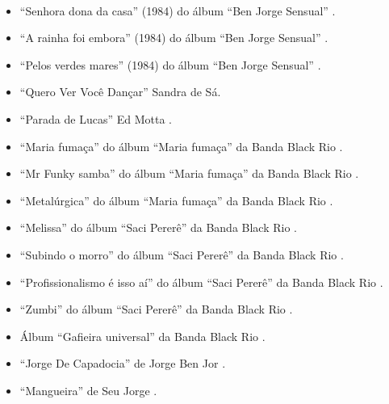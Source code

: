 \begin{example} ~

\begin{itemize}
\item ``Senhora dona da casa'' (1984) do álbum ``Ben Jorge Sensual'' \cite[pp. 195]{sanches2000tropicalismo}.
\item ``A rainha foi embora'' (1984) do álbum ``Ben Jorge Sensual'' \cite[pp. 195]{sanches2000tropicalismo}.
\item ``Pelos verdes mares'' (1984) do álbum ``Ben Jorge Sensual'' \cite[pp. 195]{sanches2000tropicalismo}.
\item ``Quero Ver Você Dançar'' Sandra de Sá.
\item ``Parada de Lucas'' Ed Motta \cite[pp. 11]{medeiros2012brazilian}.
\item ``Maria fumaça'' do álbum ``Maria fumaça'' da Banda Black Rio  \cite[pp. 11]{medeiros2012brazilian}.
\item ``Mr Funky samba'' do álbum ``Maria fumaça'' da Banda Black Rio  \cite[pp. 11]{medeiros2012brazilian}.
\item ``Metalúrgica'' do álbum ``Maria fumaça'' da Banda Black Rio  \cite[pp. 11]{medeiros2012brazilian}.
\item ``Melissa'' do álbum ``Saci Pererê'' da Banda Black Rio  \cite[pp. 11]{medeiros2012brazilian}.
\item ``Subindo o morro'' do álbum ``Saci Pererê'' da Banda Black Rio  \cite[pp. 11]{medeiros2012brazilian}.
\item ``Profissionalismo é isso aí'' do álbum ``Saci Pererê'' da Banda Black Rio  \cite[pp. 11]{medeiros2012brazilian}.
\item ``Zumbi'' do álbum ``Saci Pererê'' da Banda Black Rio  \cite[pp. 11]{medeiros2012brazilian}.
\item Álbum ``Gafieira universal'' da Banda Black Rio  \cite[pp. 11]{medeiros2012brazilian}.
\item ``Jorge De Capadocia'' de Jorge Ben Jor \cite[pp. 162]{sanches2000tropicalismo}.
\item ``Mangueira'' de Seu Jorge \cite[pp. 258]{2001raca}.
\end{itemize}
\end{example}

